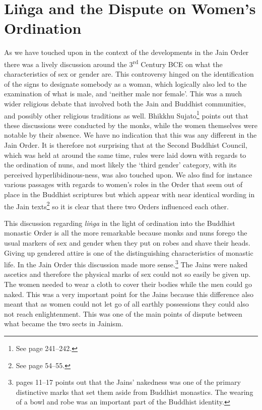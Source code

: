 \section{Liṅga and the Dispute on Women's Ordination}
\label{linga}

As we have touched upon in the context of the developments in the Jain Order there was a lively discussion around the 3\textsuperscript{rd} Century BCE on what the characteristics of sex or gender are. This controversy hinged on the identification of the signs to designate somebody as a woman, which logically also led to the examination of what is male, and `neither male nor female'. This was a much wider religious debate that involved both the Jain and Buddhist communities, and possibly other religious traditions as well. Bhikkhu Sujato\footnote{See \cite{sujato2009} page 241–242.} points out that these discussions were conducted by the monks, while the women themselves were notable by their absence. We have no indication that this was any different in the Jain Order. It is therefore not surprising that at the Second Buddhist Council, which was held at around the same time, rules were laid down with regards to the ordination of nuns, and most likely the `third gender' category, with its perceived hyperlibidinous-ness, was also touched upon. We also find for instance various passages with regards to women's roles in the Order that seem out of place in the Buddhist scriptures but which appear with near identical wording in the Jain texts\footnote{See \cite{sujato2009} page 54–55.} so it is clear that there two Orders influenced each other.

This discussion regarding {\em liṅga} in the light of ordination into the Buddhist monastic Order is all the more remarkable because monks and nuns forego the usual markers of sex and gender when they put on robes and shave their heads. Giving up gendered attire is one of the distinguishing characteristics of monastic life. In the Jain Order this discussion made more sense.\footnote{\cite{maes2016} pages 11–17 points out that the Jains' nakedness was one of the primary distinctive marks that set them aside from Buddhist monastics. The wearing of a bowl and robe was an important part of the Buddhist identity.} The Jains were naked ascetics and therefore the physical marks of sex could not so easily be given up. The women needed to wear a cloth to cover their bodies while the men could go naked. This was a very important point for the Jains because this difference also meant that as women could not let go of all earthly possessions they could also not reach enlightenment. This was one of the main points of dispute between what became the two sects in Jainism.

